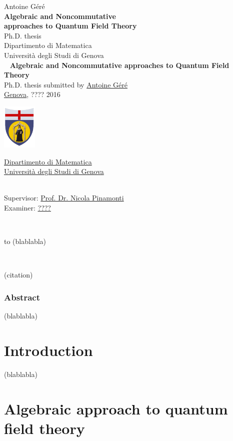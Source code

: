 \documentclass[10pt]{book}
\makeatletter
\newcommand*{\makepagetitle}{%
%
{\raggedright%
%
%
%
%
\thispagestyle{empty}%
%
\vspace*{50pt}
%
{\LARGE Antoine Géré}\\%
%
\vspace*{120pt}%
%
{\Huge\bfseries Algebraic and Noncommutative \\[8pt] approaches to Quantum Field Theory}\\[\baselineskip]%
%
\vspace*{60pt}%
%
{\LARGE Ph.D. thesis}\\[\baselineskip]%
%
\vspace*{60pt}%
%
{\LARGE Dipartimento di Matematica}\\[\baselineskip]%
%
\vspace*{1pt}
%
{\LARGE Università degli Studi di Genova}\\[\baselineskip]%
%
\vfill%
%
%
%
%
%
%
\newpage%
%
\thispagestyle{empty}%
%
\ \vfill%
%
%
\textbf{Algebraic and Noncommutative approaches to Quantum Field Theory} \\[2pt]
Ph.D. thesis submitted by \href{mailto:gere@dima.unige.it}{Antoine Géré} \\[1pt]
\href{http://www.comune.genova.it/}{Genova}, ???? 2016 \\[10pt]
%
%
\begin{minipage}{0.1\linewidth}
\includegraphics[scale=1]{unige.pdf}
\end{minipage}
%
\begin{minipage}{0.85\linewidth}
\href{http://www.dima.unige.it/}{Dipartimento di Matematica} \\[1pt]
\href{http://www.unige.it/}{Università degli Studi di Genova}
\end{minipage}
%
%
\vspace*{10pt} \\
Supervisor: \href{mailto:pinamont@dima.unige.it}{Prof. Dr. Nicola Pinamonti} \\[1pt]
%
Examiner: \href{mailto:????@????.com}{????}
%
%
%
%
%
}%
%
}%
\theoremstyle{break}
\makeatother
\begin{document}


\makepagetitle

\newpage


\ \vfill

\begin{flushright}
to (blablabla) 
\end{flushright}

\vfill


\newpage

\ \vfill

\begin{flushright}
(citation)
\end{flushright}

\vfill


\newpage

\vspace*{100pt}

\thispagestyle{empty}

\section*{Abstract}

(blablabla)


\tableofcontents


\part*{Introduction}


(blablabla)

\part{Algebraic approach to quantum field theory}
\end{document}
